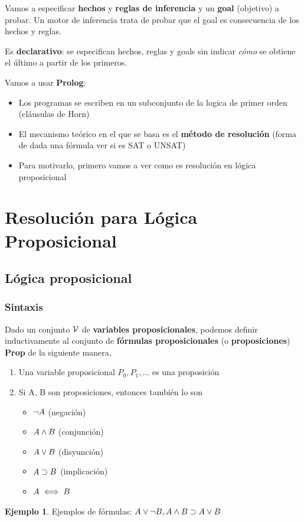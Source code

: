 \documentclass{report}
\theoremstyle{definition} %
\newtheorem*{example*}{Ejemplo}
\begin{document}
Vamos a especificar \textbf{hechos} y \textbf{reglas de inferencia} y un
\textbf{goal} (objetivo) a probar. Un motor de inferencia trata de probar que el
goal es consecuencia de los hechos y reglas.

Es \textbf{declarativo}: se especifican hechos, reglas y goals sin indicar
\textit{cómo} se obtiene el último a partir de los primeros.

Vamos a usar \textbf{Prolog}:

\begin{itemize}
    \item Los programas se escriben en un subconjunto de la logica de primer
    orden (cláusulas de Horn)
    \item El mecanismo teórico en el que se basa es el \textbf{método de
    resolución} (forma de dada una fórmula ver si es SAT o UNSAT)
    \item Para motivarlo, primero vamos a ver como es resolución en lógica
    proposicional
\end{itemize}

\section{Resolución para Lógica Proposicional}

\subsection{Lógica proposicional}

\subsubsection{Sintaxis}

Dado un conjunto $\mathcal{V}$ de \textbf{variables proposicionales}, podemos
definir inductivamente al conjunto de \textbf{fórmulas proposicionales} (o
\textbf{proposiciones}) \textbf{Prop} de la siguiente manera,

\begin{enumerate}
    \item Una variable proposicional $P_0, P_1, \dots$ es una proposición
    \item Si A, B son proposiciones, entonces también lo son
    \begin{itemize}
        \item $\neg A$ (negación)
        \item $A \wedge B$ (conjunción)
        \item $A \vee B$ (disyunción)
        \item $A \supset B$ (implicación)
        \item $A \iff B$
    \end{itemize}

\end{enumerate}
\begin{example*}
    Ejemplos de fórmulas: 
    $A \vee \neg B, A \wedge B \supset A \vee B$
\end{example*}
\end{document}

